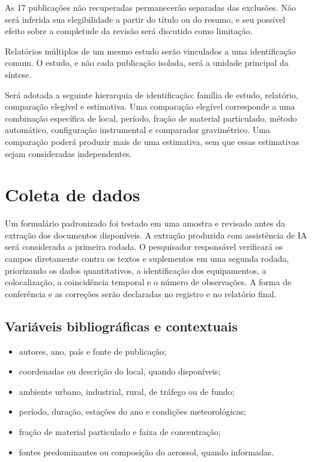 \documentclass[11pt,a4paper]{article}
\begin{document}
As 17 publicações não recuperadas permanecerão separadas das exclusões. Não será
inferida sua elegibilidade a partir do título ou do resumo, e seu possível efeito sobre
a completude da revisão será discutido como limitação.

Relatórios múltiplos de um mesmo estudo serão vinculados a uma identificação comum.
O estudo, e não cada publicação isolada, será a unidade principal da síntese.

Será adotada a seguinte hierarquia de identificação: família de estudo, relatório,
comparação elegível e estimativa. Uma comparação elegível corresponde a uma combinação
específica de local, período, fração de material particulado, método automático,
configuração instrumental e comparador gravimétrico. Uma comparação poderá produzir
mais de uma estimativa, sem que essas estimativas sejam consideradas independentes.

\section{Coleta de dados}

Um formulário padronizado foi testado em uma amostra e revisado antes da extração dos
documentos disponíveis. A extração produzida com assistência de IA será considerada a
primeira rodada. O pesquisador responsável verificará os campos diretamente contra os
textos e suplementos em uma segunda rodada, priorizando os dados quantitativos, a
identificação dos equipamentos, a colocalização, a coincidência temporal e o número de
observações. A forma de conferência e as correções serão declaradas no registro e no
relatório final.

\subsection{Variáveis bibliográficas e contextuais}

\begin{itemize}
  \item autores, ano, país e fonte de publicação;
  \item coordenadas ou descrição do local, quando disponíveis;
  \item ambiente urbano, industrial, rural, de tráfego ou de fundo;
  \item período, duração, estações do ano e condições meteorológicas;
  \item fração de material particulado e faixa de concentração;
  \item fontes predominantes ou composição do aerossol, quando informadas.
\end{itemize}
\end{document}
